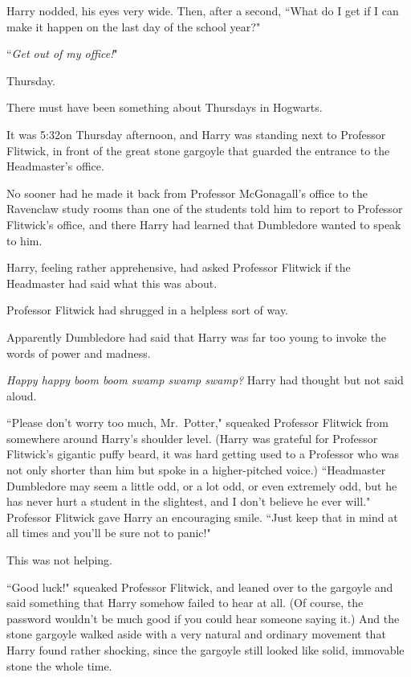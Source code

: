 Harry nodded, his eyes very wide. Then, after a second, ``What do I get if I can make it happen on the last day of the school year?"

``\emph{Get out of my office!}"

\later

Thursday.

There must have been something about Thursdays in Hogwarts.

It was 5:32\pm on Thursday afternoon, and Harry was standing next to Professor Flitwick, in front of the great stone gargoyle that guarded the entrance to the Headmaster's office.

No sooner had he made it back from Professor McGonagall's office to the Ravenclaw study rooms than one of the students told him to report to Professor Flitwick's office, and there Harry had learned that Dumbledore wanted to speak to him.

Harry, feeling rather apprehensive, had asked Professor Flitwick if the Headmaster had said what this was about.

Professor Flitwick had shrugged in a helpless sort of way.

Apparently Dumbledore had said that Harry was far too young to invoke the words of power and madness.

\emph{Happy happy boom boom swamp swamp swamp?} Harry had thought but not said aloud.

``Please don't worry too much, Mr.~Potter," squeaked Professor Flitwick from somewhere around Harry's shoulder level. (Harry was grateful for Professor Flitwick's gigantic puffy beard, it was hard getting used to a Professor who was not only shorter than him but spoke in a higher-pitched voice.) ``Headmaster Dumbledore may seem a little odd, or a lot odd, or even extremely odd, but he has never hurt a student in the slightest, and I don't believe he ever will." Professor Flitwick gave Harry an encouraging smile. ``Just keep that in mind at all times and you'll be sure not to panic!"

This was not helping.

``Good luck!" squeaked Professor Flitwick, and leaned over to the gargoyle and said something that Harry somehow failed to hear at all. (Of course, the password wouldn't be much good if you could hear someone saying it.) And the stone gargoyle walked aside with a very natural and ordinary movement that Harry found rather shocking, since the gargoyle still looked like solid, immovable stone the whole time.

